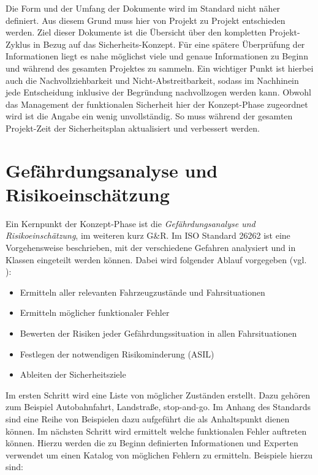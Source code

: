 \documentclass[a4paper,DIV=calc,ngerman]{scrartcl}
\begin{document}
Die Form und der Umfang der Dokumente wird im Standard nicht näher definiert. Aus diesem Grund muss hier von Projekt zu Projekt entschieden werden. Ziel dieser Dokumente ist die Übersicht über den kompletten Projekt-Zyklus in Bezug auf das Sicherheits-Konzept. Für eine spätere Überprüfung der Informationen liegt es nahe möglichst viele und genaue Informationen zu Beginn und während des gesamten Projektes zu sammeln. Ein wichtiger Punkt ist hierbei auch die Nachvollziehbarkeit und Nicht-Abstreitbarkeit, sodass im Nachhinein jede Entscheidung inklusive der Begründung nachvollzogen werden kann. Obwohl das Management der funktionalen Sicherheit hier der Konzept-Phase zugeordnet wird ist die Angabe ein wenig unvollständig. So muss während der gesamten Projekt-Zeit der Sicherheitsplan aktualisiert und verbessert werden.




\section{Gefährdungsanalyse und Risikoeinschätzung}
\label{sec:GundR}
Ein Kernpunkt der Konzept-Phase ist die \emph{Gefährdungsanalyse und Risikoeinschätzung}, im weiteren kurz G\&R. Im ISO Standard 26262 ist eine Vorgehensweise beschrieben, mit der verschiedene Gefahren analysiert und in Klassen eingeteilt werden können. Dabei wird folgender Ablauf vorgegeben (vgl. \cite[S. 123]{1}):

\begin{itemize}
    \item Ermitteln aller relevanten Fahrzeugzustände und Fahrsituationen
    \item Ermitteln möglicher funktionaler Fehler
    \item Bewerten der Risiken jeder Gefährdungssituation in allen Fahrsituationen
    \item Festlegen der notwendigen Risikominderung (ASIL)
    \item Ableiten der Sicherheitsziele
\end{itemize}

Im ersten Schritt wird eine Liste von möglicher Zuständen erstellt. Dazu gehören zum Beispiel Autobahnfahrt, Landstraße, stop-and-go. Im Anhang des Standards sind eine Reihe von Beispielen dazu aufgeführt die als Anhaltspunkt dienen können. Im nächsten Schritt wird ermittelt welche funktionalen Fehler auftreten können. Hierzu werden die zu Beginn definierten Informationen und Experten verwendet um einen Katalog von möglichen Fehlern zu ermitteln. Beispiele hierzu sind:
\end{document}
